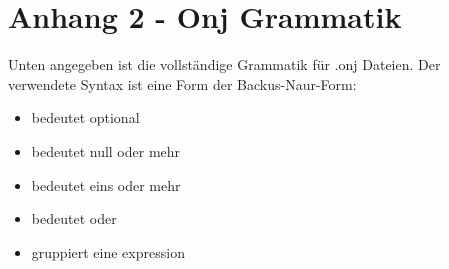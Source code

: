 
\chapter{Anhang 2 - Onj Grammatik}\label{ch:anhang-2}

\renewcommand{\kapitelautor}{Autor: Marvin Kurka}

Unten angegeben ist die vollständige Grammatik für .onj Dateien.
Der verwendete Syntax ist eine Form der Backus-Naur-Form:

\begin{itemize}
    \item {} bedeutet optional
    \item \inlineCode{*} bedeutet null oder mehr
    \item \inlineCode{+} bedeutet eins oder mehr
    \item \inlineCode{|} bedeutet oder
    \item {} gruppiert eine expression
\end{itemize}

